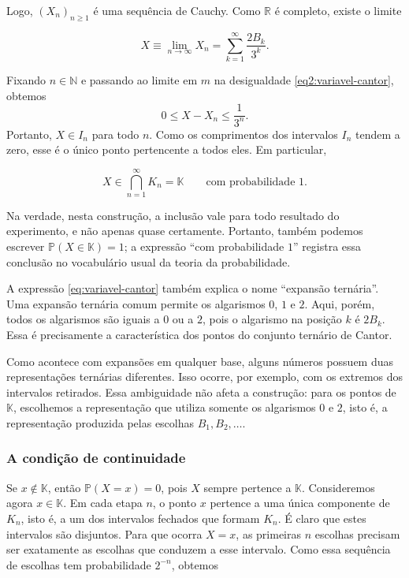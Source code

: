 \documentclass[12pt,portuguese]{article}
\theoremstyle{definition}
\theoremstyle{plainexercise}
\theoremstyle{starredexercise}
\theoremstyle{definition}
\begin{document}
Logo, $(X_n)_{n\geqslant 1}$ é uma sequência de Cauchy. Como $\mathbb{R}$ é
completo, existe o limite

\begin{equation}\label{eq:variavel-cantor}
  X\equiv\lim_{n\to\infty}X_n
  =\sum_{k=1}^{\infty}\frac{2B_k}{3^k}.
\end{equation}

Fixando $n\in\mathbb{N}$ e passando ao limite em $m$
na desigualdade \eqref{eq2:variavel-cantor}, obtemos
\[
  0\leqslant X-X_n\leqslant\frac{1}{3^n}.
\]
Portanto, $X\in I_n$ para todo $n$. Como os comprimentos dos intervalos
$I_n$ tendem a zero, esse é o único ponto pertencente a todos eles. Em particular,

\[
  X\in\bigcap_{n=1}^{\infty}K_n=\mathbb{K}
  \qquad\text{com probabilidade }1.
\]

Na verdade, nesta construção, a inclusão vale para todo resultado do
experimento, e não apenas quase certamente. Portanto, também podemos escrever
\(\mathbb{P}(X\in\mathbb{K})=1\); a expressão ``com probabilidade $1$'' registra
essa conclusão no vocabulário usual da teoria da probabilidade.

A expressão \eqref{eq:variavel-cantor} também explica o nome ``expansão
ternária''. Uma expansão ternária comum permite os algarismos $0$, $1$ e $2$.
Aqui, porém, todos os algarismos são iguais a $0$ ou a $2$, pois o algarismo
na posição $k$ é $2B_k$. Essa é precisamente a característica dos pontos do
conjunto ternário de Cantor.

Como acontece com expansões em qualquer base, alguns números possuem duas
representações ternárias diferentes. Isso ocorre, por exemplo, com os extremos
dos intervalos retirados. Essa ambiguidade não afeta a construção: para os
pontos de $\mathbb{K}$, escolhemos a representação que utiliza somente os
algarismos $0$ e $2$, isto é, a representação produzida pelas escolhas
$B_1,B_2,\ldots$.

\subsubsection{A condição de continuidade}

Se $x\notin\mathbb{K}$, então $\mathbb{P}(X=x)=0$, pois $X$ sempre pertence a
$\mathbb{K}$. Consideremos agora $x\in\mathbb{K}$. Em cada etapa $n$, o ponto
$x$ pertence a uma única componente de $K_n$, isto é, a um dos intervalos
fechados que formam $K_n$. É claro que estes intervalos são disjuntos. Para que ocorra
$X=x$, as primeiras $n$ escolhas precisam ser exatamente as escolhas que
conduzem a esse intervalo. Como essa sequência de escolhas tem probabilidade
$2^{-n}$, obtemos
\end{document}
